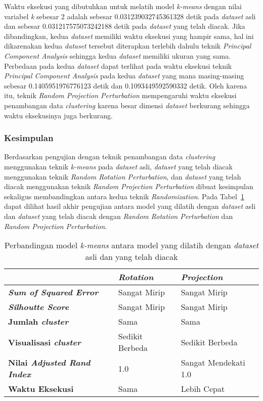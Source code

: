 Waktu eksekusi yang dibutuhkan untuk melatih model \textit{k-means} dengan nilai variabel \textit{k} sebesar 2 adalah sebesar 0.031239032745361328 detik pada \textit{dataset} asli dan sebesar 0.031217575073242188 detik pada \textit{dataset} yang telah diacak. Jika dibandingkan, kedua \textit{dataset} memiliki waktu eksekusi yang hampir sama, hal ini dikarenakan kedua \textit{dataset} tersebut diterapkan terlebih dahulu teknik \textit{Principal Component Analysis} sehingga kedua \textit{dataset} memiliki ukuran yang sama. Perbedaan pada kedua \textit{dataset} dapat terlihat pada waktu eksekusi teknik \textit{Principal Component Analysis} pada kedua \textit{dataset} yang mana masing-masing sebesar 0.1405951976776123 detik dan 0.1093449592590332 detik. Oleh karena itu, teknik \textit{Random Projection Perturbation} mempengaruhi waktu eksekusi penambangan data \textit{clustering} karena besar dimensi \textit{dataset} berkurang sehingga waktu eksekusinya juga berkurang.

\subsubsection{Kesimpulan}
\label{subsubsec:pengujian-clustering-kesimpulan}

Berdasarkan pengujian dengan teknik penambangan data \textit{clustering} menggunakan teknik \textit{k-means} pada \textit{dataset} asli, \textit{dataset} yang telah diacak menggunakan teknik \textit{Random Rotation Perturbation}, dan \textit{dataset} yang telah diacak menggunakan teknik \textit{Random Projection Perturbation} dibuat kesimpulan sekaligus membandingkan antara kedua teknik \textit{Randomization}. Pada Tabel~\ref{table:perbandingan-clustering} dapat dilihat hasil akhir pengujian antara model yang dilatih dengan \textit{dataset} asli dan \textit{dataset} yang telah diacak dengan \textit{Random Rotation Perturbation} dan \textit{Random Projection Perturbation}.

\begin{table}
	\centering
	\caption{Perbandingan model \textit{k-means} antara model yang dilatih dengan \textit{dataset} asli dan yang telah diacak}
	\begin{tabular}{|l|l|l|}
		\hline
		&\textbf{\textit{Rotation}}&\textbf{\textit{Projection}}\\ \hline
		\textbf{\textit{Sum of Squared Error}}&Sangat Mirip&Sangat Mirip\\
		\textbf{\textit{Silhoutte Score}}&Sangat Mirip&Sangat Mirip\\
		\textbf{Jumlah \textit{cluster}}&Sama&Sama\\
		\textbf{Visualisasi \textit{cluster}}&Sedikit Berbeda&Sedikit Berbeda\\
		\textbf{Nilai \textit{Adjusted Rand Index}}&1.0&Sangat Mendekati 1.0\\
		\textbf{Waktu Eksekusi}&Sama&Lebih Cepat\\
		\hline
	\end{tabular}
	\label{table:perbandingan-clustering}
\end{table}

